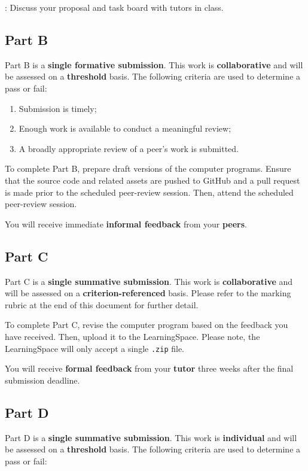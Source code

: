 \documentclass{../fal_assignment}
\begin{document}
: Discuss your proposal and task board with tutors in class.

\subsection*{Part B}

Part B is a \textbf{single formative submission}. This work is \textbf{collaborative} and will be assessed on a \textbf{threshold} basis. The following criteria are used to determine a pass or fail:

\begin{enumerate}[label=(\alph*)]
	\item Submission is timely;
	\item Enough work is available to conduct a meaningful review;
	\item A broadly appropriate review of a peer's work is submitted.
\end{enumerate}

To complete Part B, prepare draft versions of the computer programs. Ensure that the source code and related assets are pushed to GitHub and a pull request is made prior to the scheduled peer-review session. Then, attend the scheduled peer-review session.

You will receive immediate \textbf{informal feedback} from your \textbf{peers}.

\subsection*{Part C}

Part C is a \textbf{single summative submission}. This work is \textbf{collaborative} and will be assessed on a \textbf{criterion-referenced} basis. Please refer to the marking rubric at the end of this document for further detail.

To complete Part C, revise the computer program based on the feedback you have received. Then, upload it to the LearningSpace. Please note, the LearningSpace will only accept a single \texttt{.zip} file.

You will receive \textbf{formal feedback} from your \textbf{tutor} three weeks after the final submission deadline.

\subsection*{Part D}

Part D is a \textbf{single summative submission}. This work is \textbf{individual} and will be assessed on a \textbf{threshold} basis.  The following criteria are used to determine a pass or fail:
\end{document}
